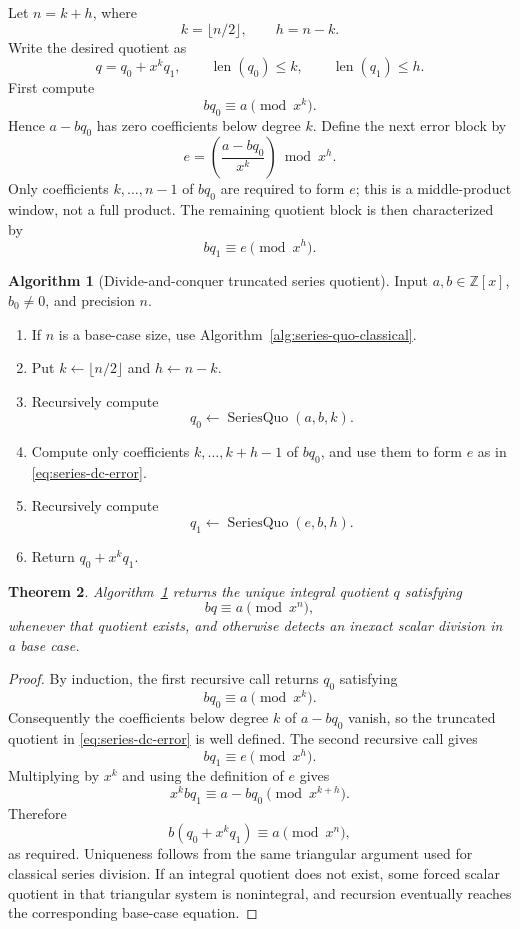 \documentclass[11pt]{book}
\newtheorem{theorem}{Theorem}[section]
\theoremstyle{definition}
\newtheorem{algorithm}[theorem]{Algorithm}
\newcommand{\ZZ}{\mathbb Z}
\newcommand{\len}{\operatorname{len}}
\begin{document}
Let $n=k+h$, where
\[
 k=\lfloor n/2\rfloor,
 \qquad
 h=n-k.
\]
Write the desired quotient as
\[
 q=q_0+x^kq_1,
 \qquad
 \len(q_0)\leq k,
 \qquad
 \len(q_1)\leq h.
\]
First compute
\[
 bq_0\equiv a\pmod{x^k}.
\]
Hence $a-bq_0$ has zero coefficients below degree $k$.  Define the next error
block by
\begin{equation}\label{eq:series-dc-error}
 e=\left(\frac{a-bq_0}{x^k}\right)\bmod x^h.
\end{equation}
Only coefficients $k,\ldots,n-1$ of $bq_0$ are required to form $e$; this is a
middle-product window, not a full product.  The remaining quotient block is
then characterized by
\[
 bq_1\equiv e\pmod{x^h}.
\]

\begin{algorithm}[Divide-and-conquer truncated series quotient]\label{alg:series-quo-dc}
Input $a,b\in\ZZ[x]$, $b_0\ne0$, and precision $n$.
\begin{enumerate}
 \item If $n$ is a base-case size, use
 Algorithm~\ref{alg:series-quo-classical}.
 \item Put $k\leftarrow\lfloor n/2\rfloor$ and $h\leftarrow n-k$.
 \item Recursively compute
 \[
  q_0\leftarrow \operatorname{SeriesQuo}(a,b,k).
 \]
 \item Compute only coefficients $k,\ldots,k+h-1$ of $bq_0$, and use them to
 form $e$ as in \eqref{eq:series-dc-error}.
 \item Recursively compute
 \[
  q_1\leftarrow \operatorname{SeriesQuo}(e,b,h).
 \]
 \item Return $q_0+x^kq_1$.
\end{enumerate}
\end{algorithm}

\begin{theorem}\label{thm:series-quo-dc-correctness}
Algorithm~\ref{alg:series-quo-dc} returns the unique integral quotient $q$
satisfying
\[
 bq\equiv a\pmod{x^n},
\]
whenever that quotient exists, and otherwise detects an inexact scalar division
in a base case.
\end{theorem}

\begin{proof}
By induction, the first recursive call returns $q_0$ satisfying
\[
 bq_0\equiv a\pmod{x^k}.
\]
Consequently the coefficients below degree $k$ of $a-bq_0$ vanish, so the
truncated quotient in \eqref{eq:series-dc-error} is well defined.  The second
recursive call gives
\[
 bq_1\equiv e\pmod{x^h}.
\]
Multiplying by $x^k$ and using the definition of $e$ gives
\[
 x^kbq_1\equiv a-bq_0\pmod{x^{k+h}}.
\]
Therefore
\[
 b(q_0+x^kq_1)\equiv a\pmod{x^n},
\]
as required.  Uniqueness follows from the same triangular argument used for
classical series division.  If an integral quotient does not exist, some
forced scalar quotient in that triangular system is nonintegral, and recursion
eventually reaches the corresponding base-case equation.
\end{proof}
\end{document}
